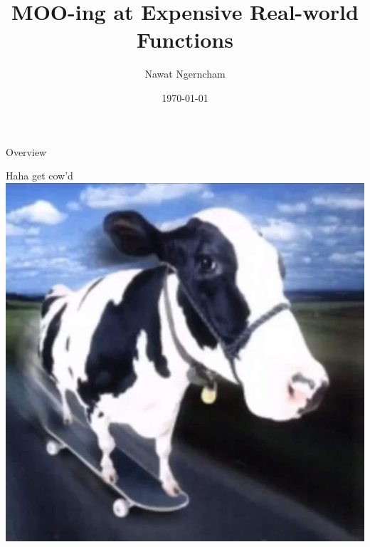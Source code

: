 \documentclass{beamer}
\title{MOO-ing at Expensive Real-world Functions}
\author{Nawat Ngerncham}
\date{\today}
\begin{document}
\begin{frame}
  \titlepage
\end{frame}

\begin{frame}{Overview}
  \tableofcontents
\end{frame}







\begin{frame}{Haha get cow'd}
    \includegraphics[width=\textwidth]{../images/get-cowd.png}
\end{frame}
\end{document}
